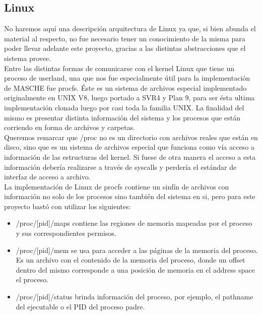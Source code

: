 \subsection{Linux}

No haremos aquí una descripción arquitectura de Linux ya que, si bien abunda el
material al respecto, no fue necesario tener un conocimiento de la misma para
poder llevar adelante este proyecto, gracias a las distintas abstracciones que
el sistema provee.\\

Entre las distintas formas de comunicarse con el kernel Linux que tiene un
proceso de userland, una que nos fue especialmente útil para la implementación
de MASCHE fue procfs. Éste es un sistema de archivos especial implementado
originalmente en UNIX V8, luego portado a SVR4 y Plan 9, para ser ésta ultima
implementación clonada luego por casi toda la familia UNIX. La finalidad del
mismo es presentar distinta información del sistema y los procesos que están
corriendo en forma de archivos y carpetas.\\

Queremos remarcar que /proc no es un directorio con archivos reales que están
en disco, sino que es un sistema de archivos especial que funciona como vía
acceso a información de las estructuras del kernel. Si fuese de otra manera el
acceso a esta información debería realizarse a través de syscalls y perdería el
estándar de interfaz de acceso a archivo.\\

La implementación de Linux de procfs contiene un sinfín de archivos con
información no solo de los procesos sino también del sistema en si, pero para
este proyecto bastó con utilizar los siguientes:\\

\begin{itemize}

\item /proc/[pid]/maps contiene las regiones de memoria mapeadas por el proceso
    y sus correspondientes permisos.

\item /proc/[pid]/mem se usa para acceder a las páginas de la memoria del
    proceso. Es un archivo con el contenido de la memoria del proceso, donde un
    offset dentro del mismo corresponde a una posición de memoria en el address
    space el proceso.

\item /proc/[pid]/status brinda información del proceso, por ejemplo, el
    pathname del ejecutable o el PID del proceso padre.

\end{itemize}
